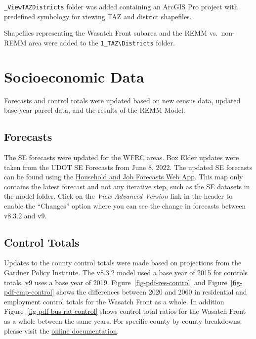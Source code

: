 \documentclass[
  letterpaper,
  DIV=11,
  numbers=noendperiod,
  titlepage=false]{scrreprt}
\begin{document}
\texttt{\_ViewTAZDistricts} folder was added containing an ArcGIS Pro
project with predefined symbology for viewing TAZ and district
shapefiles.

Shapefiles representing the Wasatch Front subarea and the REMM
vs.~non-REMM area were added to the
\texttt{1\_TAZ\textbackslash{}Districts} folder.

\hypertarget{socioeconomic-data}{%
\section{Socioeconomic Data}\label{socioeconomic-data}}

Forecasts and control totals were updated based on new census data,
updated base year parcel data, and the results of the REMM Model.

\hypertarget{forecasts}{%
\subsection{Forecasts}\label{forecasts}}

The SE forecasts were updated for the WFRC areas. Box Elder updates were
taken from the UDOT SE Forecasts from June 8, 2022. The updated SE
forecasts can be found using the
\href{https://wfrc.org/household-job-forecast-map}{Household and Job
Forecasts Web App}. This map only contains the latest forecast and not
any iterative step, such as the SE datasets in the model folder. Click
on the \emph{View Advanced Version} link in the header to enable the
``Changes'' option where you can see the change in forecasts between
v8.3.2 and v9.

\hypertarget{control-totals}{%
\subsection{Control Totals}\label{control-totals}}

Updates to the county control totals were made based on projections from
the Gardner Policy Institute. The v8.3.2 model used a base year of 2015
for controls totals. v9 uses a base year of 2019.
Figure~\ref{fig-pdf-res-control} and Figure~\ref{fig-pdf-emp-control}
shows the differences between 2020 and 2060 in residential and
employment control totals for the Wasatch Front as a whole. In addition
Figure~\ref{fig-pdf-bus-rat-control} shows control total ratios for the
Wasatch Front as a whole between the same years. For specific county by
county breakdowns, please visit the
\href{https://wfrc.org/wftdm-docs/v9x/v900/whats-new/2-inputdata.html}{online
documentation}.
\end{document}
